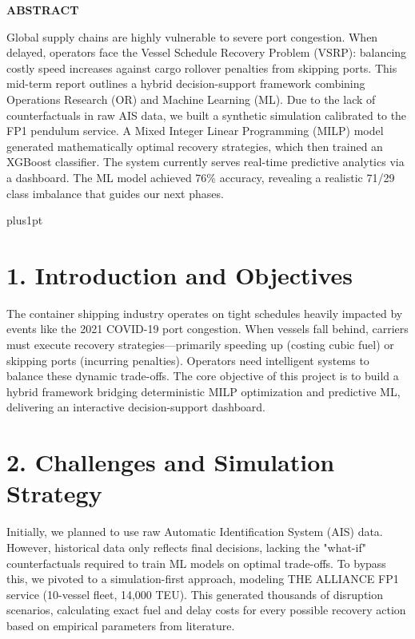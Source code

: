 \documentclass[12pt]{article}
\begin{document}
\begin{center}
    \Large \textbf{ABSTRACT}
\end{center}
\vspace{0.3cm}
\noindent Global supply chains are highly vulnerable to severe port congestion. When delayed, operators face the Vessel Schedule Recovery Problem (VSRP): balancing costly speed increases against cargo rollover penalties from skipping ports. This mid-term report outlines a hybrid decision-support framework combining Operations Research (OR) and Machine Learning (ML). Due to the lack of counterfactuals in raw AIS data, we built a synthetic simulation calibrated to the FP1 pendulum service. A Mixed Integer Linear Programming (MILP) model generated mathematically optimal recovery strategies, which then trained an XGBoost classifier. The system currently serves real-time predictive analytics via a dashboard. The ML model achieved 76\% accuracy, revealing a realistic 71/29 class imbalance that guides our next phases.

\vspace{0.5cm}
\tableofcontents

\clearpage
{}
\baselineskip=16pt plus1pt

\section*{1. Introduction and Objectives}
The container shipping industry operates on tight schedules heavily impacted by events like the 2021 COVID-19 port congestion. When vessels fall behind, carriers must execute recovery strategies—primarily speeding up (costing cubic fuel) or skipping ports (incurring penalties). Operators need intelligent systems to balance these dynamic trade-offs. The core objective of this project is to build a hybrid framework bridging deterministic MILP optimization and predictive ML, delivering an interactive decision-support dashboard.

\section*{2. Challenges and Simulation Strategy}
Initially, we planned to use raw Automatic Identification System (AIS) data. However, historical data only reflects final decisions, lacking the "what-if" counterfactuals required to train ML models on optimal trade-offs. To bypass this, we pivoted to a simulation-first approach, modeling THE ALLIANCE FP1 service (10-vessel fleet, 14,000 TEU). This generated thousands of disruption scenarios, calculating exact fuel and delay costs for every possible recovery action based on empirical parameters from literature.
\end{document}
